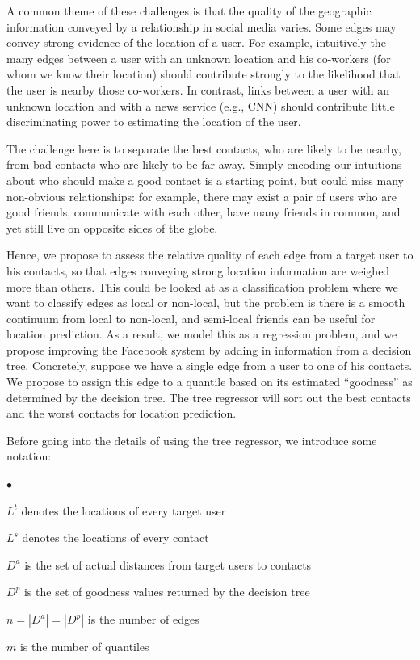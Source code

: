 \documentclass{sig-alternate}
\newcommand{\squishlist}{
\begin{list}
	{$\bullet$} { \setlength{
	\itemsep}{0pt} \setlength{\parsep}{3pt} \setlength{\topsep}{3pt} \setlength{
	\partopsep}{0pt} \setlength{\leftmargin}{1.5em} \setlength{\labelwidth}{1em} \setlength{\labelsep}{0.5em} } }
\newcommand{\squishend}{
\end{list}
}
\begin{document}
A common theme of these challenges is that the quality of the geographic
information conveyed by a relationship in social media varies.
%
Some edges may convey strong evidence of the location of a user.
%
For example, intuitively the many edges between a user with an unknown location
and his co-workers (for whom we know their location) should contribute strongly
to the likelihood that the user is nearby those co-workers.
%
In contrast, links between a user with an unknown location and with a news
service (e.g., CNN) should contribute little discriminating power to estimating
the location of the user.

The challenge here is to separate the best contacts, who are likely to be
nearby, from bad contacts who are likely to be far away.
%
Simply encoding our intuitions about who should make a good contact is a
starting point, but could miss many non-obvious relationships: for example,
there may exist a pair of users who are good friends, communicate with each
other, have many friends in common, and yet still live on opposite sides of the
globe.

Hence, we propose to assess the relative quality of each edge from a target
user to his contacts, so that edges conveying strong location information are
weighed more than others.
%
This could be looked at as a classification problem where we want to classify
edges as local or non-local, but the problem is there is a smooth continuum
from local to non-local, and semi-local friends can be useful for location
prediction.
%
As a result, we model this as a regression problem, and we propose improving
the Facebook system by adding in information from a decision tree.
%
Concretely, suppose we have a single edge from a user to one of his contacts.
We propose to assign this edge to a quantile based on its estimated
``goodness'' as determined by the decision tree.
The tree regressor will sort out the best contacts and the worst contacts for
location prediction.

Before going into the details of using the tree regressor, we introduce some notation:
\squishlist
\item $L^t$ denotes the locations of every target user
\item $L^s$ denotes the locations of every contact
\item $D^a$ is the set of actual distances from target users to contacts
\item $D^p$ is the set of goodness values returned by the decision tree
\item $n = |D^a| = |D^p|$ is the number of edges
\item $m$ is the number of quantiles
\squishend
\end{document}
